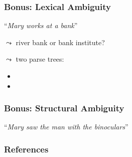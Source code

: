 \documentclass[dvipsnames]{beamer}
\def\str#1{``\textit{#1}''}   %
\begin{document}
\begin{frame}
    \frametitle{Bonus: Lexical Ambiguity}
    
    \str{Mary works at a bank}

    \vspace{1em}
    $\leadsto$ river bank or bank institute?

    \vspace{1em}
    $\leadsto$ two parse trees:
    \begin{itemize}
        \item {}
        \item {}
    \end{itemize}
\end{frame}

\begin{frame}
    \frametitle{Bonus: Structural Ambiguity}
    
    \str{Mary saw the man with the binoculars}

    \vspace{1em}
    \begin{minipage}[t]{0.5\textwidth}
    \end{minipage}\hfill
    \begin{minipage}[t]{0.5\textwidth}
    \end{minipage}
\end{frame}

\begin{frame}[allowframebreaks]
    \frametitle{References}
    
\end{frame}
\end{document}

